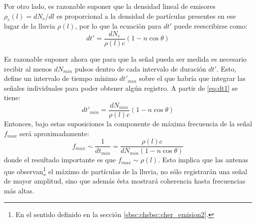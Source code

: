 	Por otro lado, es razonable suponer que la densidad lineal de emisores $\rho_e(l) = dN_e/dl$ es proporcional a la densidad de part\'iculas presentes en ese lugar de la lluvia $\rho(l)$, por lo que la ecuaci\'on para $dt'$ puede reescribirse como:
	\begin{equation}
	 dt' = \frac{dN_e}{\rho(l) c}(1-n\cos\theta)
	 \label{eq:dt1}
	\end{equation}
	

	
	Es razonable suponer ahora que para que la se\~nal pueda ser medida es necesario recibir al menos $dN_{min}$ pulsos dentro de cada intervalo de duraci\'on $dt'$.
	Esto, define un intervalo de tiempo m\'inimo $dt'_{min}$ sobre el que habr\'ia que integrar las se\~nales individuales para poder obtener alg\'un registro. A partir de \ref{eq:dt1} se tiene:
	\begin{equation}
	 dt'_{min} = \frac{dN_{min}}{\rho(l) c}(1-n\cos\theta)
	\end{equation}
	Entonces, bajo estas suposiciones la componente de m\'axima frecuencia de la se\~nal $f_{max}$  ser\'a aproximadamente:
	\begin{equation}
	 f_{max}\sim \frac{1}{dt_{min}} = \frac{\rho(l) c}{dN_{min}(1-n\cos\theta)}
	\end{equation}
	donde el resultado importante es que $f_{max}\sim\rho(l)$. 
	Esto implica que las antenas que observan\footnote{En el sentido definido en la secci\'on \ref{sbsc:chsbsc:cher_emision2}.} el m\'aximo de part\'iculas de la lluvia, no s\'olo registrar\'an una se\~nal de mayor amplitud, sino que adem\'as \'esta mostrar\'a coherencia hasta frecuencias m\'as altas.
	

